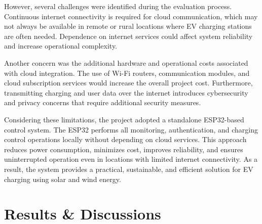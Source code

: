 \documentclass[12pt]{report}
\begin{document}
\begin{Certificatepage}
\begin{center}
\begin{justify}
\par
However, several challenges were identified during the evaluation process. Continuous internet connectivity is required for cloud communication, which may not always be available in remote or rural locations where EV charging stations are often needed. Dependence on internet services could affect system reliability and increase operational complexity.

\par
Another concern was the additional hardware and operational costs associated with cloud integration. The use of Wi-Fi routers, communication modules, and cloud subscription services would increase the overall project cost. Furthermore, transmitting charging and user data over the internet introduces cybersecurity and privacy concerns that require additional security measures.

\par
Considering these limitations, the project adopted a standalone ESP32-based control system. The ESP32 performs all monitoring, authentication, and charging control operations locally without depending on cloud services. This approach reduces power consumption, minimizes cost, improves reliability, and ensures uninterrupted operation even in locations with limited internet connectivity. As a result, the system provides a practical, sustainable, and efficient solution for EV charging using solar and wind energy.

\newpage

\chapter{Results \& Discussions}
\label{chapter4}


\end{justify}
\end{center}
\end{Certificatepage}
\end{document}

